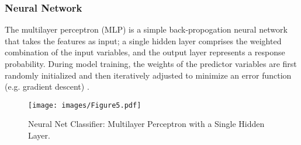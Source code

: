 \documentclass[sigconf]{acmart}
\begin{document}
\subsubsection{Neural Network} The multilayer perceptron (MLP) is a simple
back-propogation neural network that takes the features as input; a single 
hidden layer comprises the weighted combination of the input variables, and 
the output layer represents a response probability. During model training, 
the weights of the predictor variables are first randomly initialized and 
then iteratively adjusted to minimize an error function (e.g. gradient 
descent) \cite{brown12}.

\begin{figure}[!ht]
  \centering\texttt{[image: images/Figure5.pdf]}
  \caption{Neural Net Classifier: Multilayer Perceptron with a Single Hidden Layer.}
  \label{f:Figure5}
\end{figure}
\end{document}
